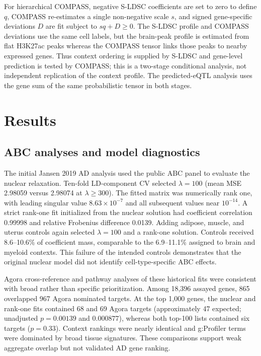 \documentclass[11pt]{article}
\begin{document}
For hierarchical COMPASS, negative S-LDSC coefficients are set to zero to define $q$, COMPASS re-estimates a single non-negative scale $s$, and signed gene-specific deviations $D$ are fit subject to $s q+D\ge0$. The S-LDSC profile and COMPASS deviations use the same cell labels, but the brain-peak profile is estimated from flat H3K27ac peaks whereas the COMPASS tensor links those peaks to nearby expressed genes. Thus context ordering is supplied by S-LDSC and gene-level prediction is tested by COMPASS; this is a two-stage conditional analysis, not independent replication of the context profile. The predicted-eQTL analysis uses the gene sum of the same probabilistic tensor in both stages.

\section{Results}

\subsection{ABC analyses and model diagnostics}

The initial Jansen 2019 AD analysis used the public ABC panel to evaluate the nuclear relaxation. Ten-fold LD-component CV selected $\lambda=100$ (mean MSE 2.98059 versus 2.98074 at $\lambda\ge300$). The fitted matrix was numerically rank one, with leading singular value $8.63\times10^{-7}$ and all subsequent values near $10^{-14}$. A strict rank-one fit initialized from the nuclear solution had coefficient correlation 0.99998 and relative Frobenius difference 0.0139. Adding adipose, muscle, and uterus controls again selected $\lambda=100$ and a rank-one solution. Controls received 8.6--10.6\% of coefficient mass, comparable to the 6.9--11.1\% assigned to brain and myeloid contexts. This failure of the intended controls demonstrates that the original nuclear model did not identify cell-type-specific ABC effects.

Agora cross-reference and pathway analyses of these historical fits were consistent with broad rather than specific prioritization. Among 18,396 assayed genes, 865 overlapped 967 Agora nominated targets. At the top 1,000 genes, the nuclear and rank-one fits contained 68 and 69 Agora targets (approximately 47 expected; unadjusted $p=0.00139$ and $0.000877$), whereas both top-100 lists contained six targets ($p=0.33$). Context rankings were nearly identical and g:Profiler terms were dominated by broad tissue signatures. These comparisons support weak aggregate overlap but not validated AD gene ranking.
\end{document}
